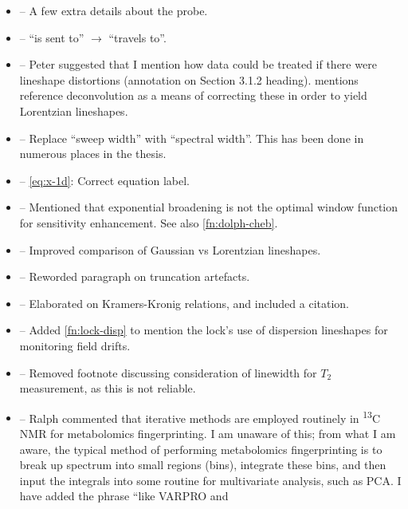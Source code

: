 \documentclass[12pt]{article}
\begin{document}
\begin{itemize}
        \item {} -- A few extra details about the probe.
        \item {} -- ``is sent to'' $\rightarrow$ ``travels to''.
        \item {} -- Peter suggested that I mention how
            data could be treated if there were lineshape distortions
            (annotation on Section 3.1.2 heading).  mentions
            reference deconvolution as a means of correcting these in order to
            yield Lorentzian lineshapes.
        \item {} -- Replace ``sweep width'' with ``spectral
            width''. This has been done in numerous places in the thesis.
        \item {} -- \cref{eq:x-1d}: Correct equation label.
        \item {} -- Mentioned that exponential broadening
            is not the optimal window function for sensitivity enhancement. See
            also \cref{fn:dolph-cheb}.
        \item {} -- Improved comparison of Gaussian vs
            Lorentzian lineshapes.
        \item {} -- Reworded paragraph on truncation artefacts.
        \item {} -- Elaborated on Kramers-Kronig
            relations, and included a citation.
        \item {} -- Added \cref{fn:lock-disp} to mention
            the lock's use of dispersion lineshapes for monitoring field
            drifts.
        \item {} -- Removed footnote discussing
            consideration of linewidth for $T_2$ measurement, as this is not
            reliable.
        \item {} -- Ralph commented that iterative methods
            are employed routinely in \textsuperscript{13}C NMR for
            metabolomics fingerprinting. I am unaware of this; from what I am
            aware, the typical method of performing metabolomics fingerprinting
            is to break up spectrum into small regions (bins), integrate these
            bins, and then input the integrals into some routine for multivariate
            analysis, such as PCA. I have added the phrase ``like VARPRO and

\end{itemize}
\end{document}

